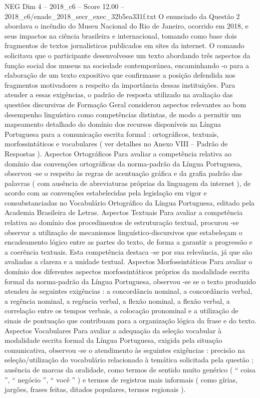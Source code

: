 \begin{textsample}{NEG Dim 4 – 2018\_c6 – Score 12.00 – 2018\_c6/enade\_2018\_secr\_exec\_32b5ea331f.txt}
O enunciado da Questão 2 abordava o incêndio do Museu Nacional do Rio de Janeiro, ocorrido em 2018, e seus impactos na ciência brasileira e internacional, tomando como base dois fragmentos de textos jornalísticos publicados em sites da internet.
O comando solicitava que o participante desenvolvesse um texto abordando três aspectos da função social dos museus na sociedade contemporânea, encaminhando -o para a elaboração de um texto expositivo que confirmasse a posição defendida nos fragmentos motivadores a respeito da importância dessas instituições.
Para atender a essas exigências, o padrão de resposta utilizado na avaliação das questões discursivas de Formação Geral considerou aspectos relevantes ao bom desempenho linguístico como competências distintas, de modo a permitir um mapeamento detalhado do domínio dos recursos disponíveis na Língua Portuguesa para a comunicação escrita formal : ortográficos, textuais, morfossintáticos e vocabulares ( ver detalhes no Anexo VIII – Padrão de Respostas ).
Aspectos Ortográficos Para avaliar a competência relativa ao domínio das convenções ortográficas da norma-padrão da Língua Portuguesa, observou -se o respeito às regras de acentuação gráfica e da grafia padrão das palavras ( com ausência de abreviaturas próprias da linguagem da internet ), de acordo com as convenções estabelecidas pela legislação em vigor e consubstanciadas no Vocabulário Ortográfico da Língua Portuguesa, editado pela Academia Brasileira de Letras.
Aspectos Textuais Para avaliar a competência relativa ao domínio dos procedimentos de estruturação textual, procurou -se observar a utilização de mecanismos linguístico-discursivos que estabeleçam o encadeamento lógico entre as partes do texto, de forma a garantir a progressão e a coerência textuais.
Esta competência destaca -se por sua relevância, já que são avaliadas a clareza e a unidade textual.
Aspectos Morfossintáticos Para avaliar o domínio dos diferentes aspectos morfossintáticos próprios da modalidade escrita formal da norma-padrão da Língua Portuguesa, observou -se se o texto produzido atendeu às seguintes exigências : a concordância nominal, a concordância verbal, a regência nominal, a regência verbal, a flexão nominal, a flexão verbal, a correlação entre os tempos verbais, a colocação pronominal e a utilização de sinais de pontuação que contribuam para a organização lógica da frase e do texto.
Aspectos Vocabulares Para avaliar a adequação da seleção vocabular à modalidade escrita formal da Língua Portuguesa, exigida pela situação comunicativa, observou -se o atendimento às seguintes exigências : precisão na seleção/utilização do vocabulário relacionado à temática solicitada pela questão ; ausência de marcas da oralidade, como termos de sentido muito genérico ( “ coisa ”, “ negócio ”, “ você ” ) e termos de registros mais informais ( como gírias, jargões, frases feitas, ditados populares, termos regionais ).

\end{textsample}
